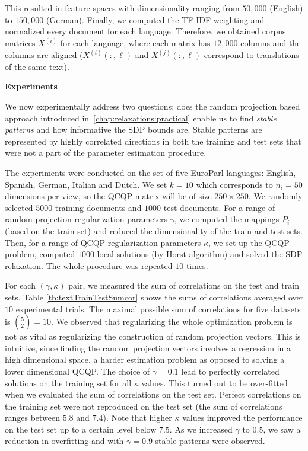 This resulted in feature spaces with
dimensionality ranging from $50,000$ (English) to $150,000$
(German). Finally, we computed the TF-IDF weighting and normalized
every document for each language. Therefore, we obtained
corpus matrices $X^{(i)}$ for each language, where each
matrix has $12,000$ columns and the columns are aligned
($X^{(i)}\left(:,\ell\right)$ and $X^{(j)}\left(:,\ell\right)$ correspond to
translations of the same text). 

\noindent\textbf{Experiments}

We now experimentally address two questions: does the random projection
based approach introduced in~\ref{chap:relaxations:practical} enable us to 
find \emph{stable patterns} and how informative the SDP
bounds are. Stable patterns are represented by highly correlated directions
in both the training and test sets that were not a part of the parameter
estimation procedure.

The experiments were conducted on the set of five EuroParl
languages: English, Spanish, German, Italian and Dutch. We set
$k = 10$ which corresponds to $n_i = 50$ dimensions per view, so
the QCQP matrix will be of size $250 \times 250$. We randomly
selected $5000$ training documents and $1000$ test documents.  For
a range of random projection regularization parameters $\gamma$,
we computed the mappings $P_i$ (based on the train set) and
reduced the dimensionality of the train and test sets. Then, for
a range of QCQP regularization parameters $\kappa$, we set up the
QCQP problem, computed $1000$ local solutions (by Horst
algorithm) and solved the SDP relaxation. The whole procedure was
repeated $10$ times.

For each $(\gamma, \kappa)$ pair, we measured the sum of
correlations on the test and train sets. Table
\ref{tb:textTrainTestSumcor} shows the sums of correlations
averaged over $10$ experimental trials. The maximal possible sum
of correlations for five datasets is $\binom{5}{2} = 10$.
We observed that regularizing the whole optimization problem is
not as vital as regularizing the construction of random
projection vectors. This is intuitive, since finding the
random projection vectors involves a regression in a high
dimensional space, a harder estimation problem as opposed to 
solving a lower dimensional QCQP. 
The choice of $\gamma = 0.1$ lead to perfectly correlated
solutions on the training set for all $\kappa$ values. This turned out to
be over-fitted when we evaluated the sum of correlations on the
test set. Perfect correlations on the training set were not reproduced on 
the test set (the sum of correlations ranges between $5.8$ and $7.4$).
Note that higher $\kappa$ values improved the
performance on the test set up to a certain level below
$7.5$. As we increased $\gamma$ to $0.5$, we saw a reduction in
overfitting and with $\gamma = 0.9$  stable patterns were observed. 


